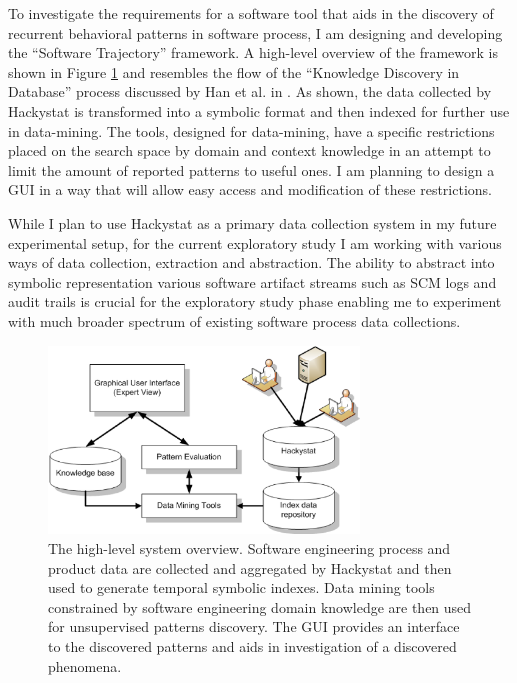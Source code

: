\documentclass{sig-alternate}
\begin{document}
To investigate the requirements for a software tool that aids in the discovery of recurrent behavioral patterns in software process, I am designing and developing the ``Software Trajectory'' framework. A high-level overview of the framework is shown in Figure \ref{fig:system_overview} and resembles the flow of the ``Knowledge Discovery in Database'' process discussed by Han et al. in \cite{citeulike:709476}. As shown, the data collected by Hackystat is transformed into a symbolic format and then indexed for further use in data-mining. The tools, designed for data-mining, have a specific restrictions placed on the search space by domain and context knowledge in an attempt to limit the amount of reported patterns to useful ones. I am planning to design a GUI in a way that will allow easy access and modification of these restrictions.

While I plan to use Hackystat as a primary data collection system in my future experimental setup, for the current exploratory study I am working with various ways of data collection, extraction and abstraction. The ability to abstract into symbolic representation various software artifact streams such as SCM logs and audit trails is crucial for the exploratory study phase enabling me to experiment with much broader spectrum of existing software process data collections.

\begin{figure}[tbp]
   \centering
   \includegraphics[height=50mm]{system_overview.eps}
   \caption{The high-level system overview. Software engineering process and product data are collected and aggregated by Hackystat and then used to generate temporal symbolic indexes. Data mining tools constrained by software engineering domain knowledge are then used for unsupervised patterns discovery. The GUI provides an interface to the discovered patterns and aids in investigation of a discovered phenomena.}
   \label{fig:system_overview}
\end{figure}
 
\end{document}

